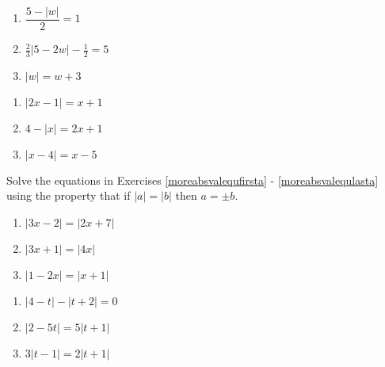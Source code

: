\begin{multicols}{3}
\begin{enumerate}
\setcounter{enumi}{\value{HW}}

\item $\dfrac{5 - |w|}{2} = 1$
\item $\frac{2}{3} |5-2w| - \frac{1}{2} = 5$ 
\item $|w| = w + 3$ 

\setcounter{HW}{\value{enumi}}
\end{enumerate}
\end{multicols}


\begin{multicols}{3}
\begin{enumerate}
\setcounter{enumi}{\value{HW}}

\item  $|2x-1| = x+1$
\item  $4 - |x| = 2x+1$
\item  $|x-4| = x-5$ \label{solveabsvalequlasta}

\setcounter{HW}{\value{enumi}}
\end{enumerate}
\end{multicols}


Solve the equations in Exercises \ref{moreabsvalequfirsta} - \ref{moreabsvalequlasta} using  the property that if $|a| = |b|$ then  $a = \pm b$. 


\begin{multicols}{3}
\begin{enumerate}
\setcounter{enumi}{\value{HW}}

\item $|3x - 2| = |2x + 7|$  \label{moreabsvalequfirsta}
\item $|3x+1| = |4x|$
\item $|1-2x| = |x+1|$

\setcounter{HW}{\value{enumi}}
\end{enumerate}
\end{multicols}


\begin{multicols}{3}
\begin{enumerate}
\setcounter{enumi}{\value{HW}}

\item  $|4-t| - |t+2| = 0$
\item $|2-5t| = 5 |t+1|$
\item $3|t-1| = 2|t+1|$ \label{moreabsvalequlasta}


\setcounter{HW}{\value{enumi}}
\end{enumerate}
\end{multicols}


